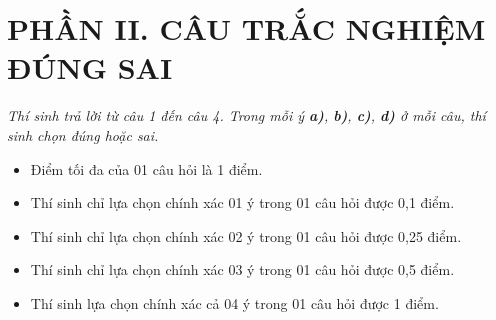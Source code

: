 \documentclass[12pt,a4paper]{article}
\begin{document}
\section*{\large PHẦN II. CÂU TRẮC NGHIỆM ĐÚNG SAI}
\textit{Thí sinh trả lời từ câu 1 đến câu 4. Trong mỗi ý \textbf{a)}, \textbf{b)}, \textbf{c)}, \textbf{d)} ở mỗi câu, thí sinh chọn đúng hoặc sai.}
\begin{itemize}[leftmargin=*]
    \item Điểm tối đa của 01 câu hỏi là 1 điểm.
    \item Thí sinh chỉ lựa chọn chính xác 01 ý trong 01 câu hỏi được 0,1 điểm.
    \item Thí sinh chỉ lựa chọn chính xác 02 ý trong 01 câu hỏi được 0,25 điểm.
    \item Thí sinh chỉ lựa chọn chính xác 03 ý trong 01 câu hỏi được 0,5 điểm.
    \item Thí sinh lựa chọn chính xác cả 04 ý trong 01 câu hỏi được 1 điểm.
\end{itemize}
\end{document}
